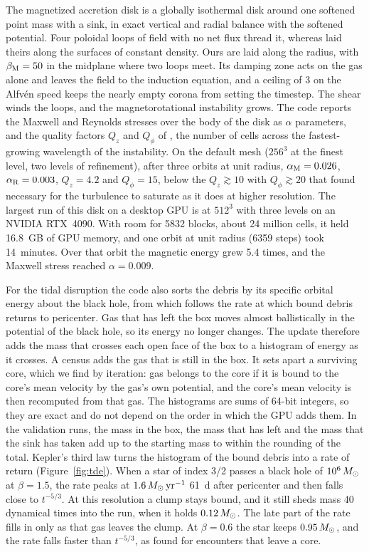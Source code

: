 \documentclass[twocolumn]{aastex701}
\begin{document}
The magnetized accretion disk is a globally isothermal disk around one softened point mass with a sink, in exact vertical and radial balance with the softened potential. Four poloidal loops of field with no net flux thread it, whereas \citet{Hawley2000} laid theirs along the surfaces of constant density. Ours are laid along the radius, with $\beta_{\rm M} = 50$ in the midplane where two loops meet. Its damping zone acts on the gas alone and leaves the field to the induction equation, and a ceiling of 3 on the Alfv\'en speed keeps the nearly empty corona from setting the timestep. The shear winds the loops, and the magnetorotational instability \citep{Balbus1991} grows. The code reports the Maxwell and Reynolds stresses over the body of the disk as $\alpha$ parameters, and the quality factors $Q_z$ and $Q_\phi$ of \citet{Hawley2011}, the number of cells across the fastest-growing wavelength of the instability. On the default mesh ($256^3$ at the finest level, two levels of refinement), after three orbits at unit radius, $\alpha_{\rm M} = 0.026$, $\alpha_{\rm R} = 0.003$, $Q_z = 4.2$ and $Q_\phi = 15$, below the $Q_z \gtrsim 10$ with $Q_\phi \gtrsim 20$ that \citet{Hawley2011} found necessary for the turbulence to saturate as it does at higher resolution. The largest run of this disk on a desktop GPU is at $512^3$ with three levels on an NVIDIA RTX~4090. With room for 5832 blocks, about 24 million cells, it held 16.8~GB of GPU memory, and one orbit at unit radius (6359 steps) took 14~minutes. Over that orbit the magnetic energy grew 5.4 times, and the Maxwell stress reached $\alpha = 0.009$.

For the tidal disruption the code also sorts the debris by its specific orbital energy about the black hole, from which follows the rate at which bound debris returns to pericenter. Gas that has left the box moves almost ballistically in the potential of the black hole, so its energy no longer changes. The update therefore adds the mass that crosses each open face of the box to a histogram of energy as it crosses. A census adds the gas that is still in the box. It sets apart a surviving core, which we find by iteration: gas belongs to the core if it is bound to the core's mean velocity by the gas's own potential, and the core's mean velocity is then recomputed from that gas. The histograms are sums of 64-bit integers, so they are exact and do not depend on the order in which the GPU adds them. In the validation runs, the mass in the box, the mass that has left and the mass that the sink has taken add up to the starting mass to within the rounding of the total. Kepler's third law turns the histogram of the bound debris into a rate of return (\mbox{Figure~\ref{fig:tde}}). When a star of index 3/2 passes a black hole of $10^6\,M_\odot$ at $\beta = 1.5$, the rate peaks at $1.6\,M_\odot\,\mathrm{yr}^{-1}$ 61~d after pericenter and then falls close to $t^{-5/3}$. At this resolution a clump stays bound, and it still sheds mass 40 dynamical times into the run, when it holds $0.12\,M_\odot$. The late part of the rate fills in only as that gas leaves the clump. At $\beta = 0.6$ the star keeps $0.95\,M_\odot$, and the rate falls faster than $t^{-5/3}$, as \citet{Guillochon2013} found for encounters that leave a core.
\end{document}
